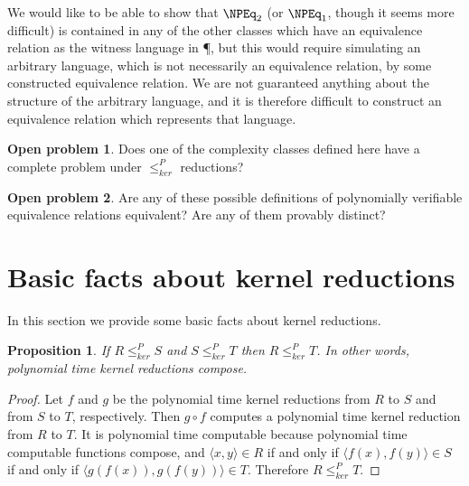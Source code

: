 \documentclass[draft]{article}
\newtheorem{proposition}[proposition]{Proposition}
\theoremstyle{definition} \newtheorem{openproblem}[openproblem]{Open problem}
\theoremstyle{definition} \newtheorem{definition}[definition]{Definition}
\theoremstyle{remark} \newtheorem{remark}[remark]{Remark}
\newcommand{\kr}{\leq^{P}_{ker}} %
\newcommand{\pair}[2]{\langle#1,#2\rangle} %
\begin{document}
We would like to be able to show that $\NPEq_2$ (or $\NPEq_1$, though it seems more difficult) is contained in any of the other classes which have an equivalence relation as the witness language in \P, but this would require simulating an arbitrary language, which is not necessarily an equivalence relation, by some constructed equivalence relation.
We are not guaranteed anything about the structure of the arbitrary language, and it is therefore difficult to construct an equivalence relation which represents that language.

\begin{openproblem}
  Does one of the complexity classes defined here have a complete problem under $\kr$ reductions?
\end{openproblem}
\begin{openproblem}
  Are any of these possible definitions of polynomially verifiable equivalence relations equivalent? Are any of them provably distinct?
\end{openproblem}

\section{Basic facts about kernel reductions}

In this section we provide some basic facts about kernel reductions.

\begin{proposition}\label{prop:compose}
  If $R\kr S$ and $S\kr T$ then $R\kr T$. In other words, polynomial time kernel reductions compose.
\end{proposition}
\begin{proof}
  Let $f$ and $g$ be the polynomial time kernel reductions from $R$ to $S$ and from $S$ to $T$, respectively.
  Then $g\circ f$ computes a polynomial time kernel reduction from $R$ to $T$.
  It is polynomial time computable because polynomial time computable functions compose, and $\pair{x}{y}\in R$ if and only if $\pair{f(x)}{f(y)}\in S$ if and only if $\pair{g(f(x))}{g(f(y))}\in T$.
  Therefore $R\kr T$.
\end{proof}
\end{document}
